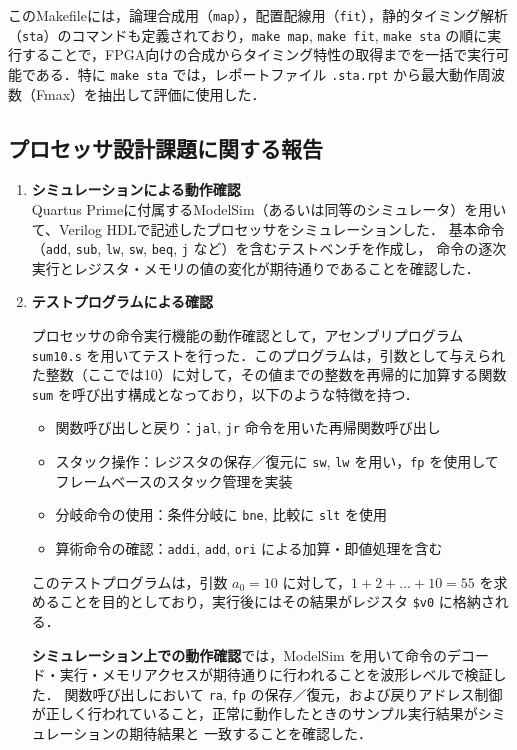 \documentclass[autodetect-engine,dvi=dvipdfmx,ja=standard,
               a4j,11pt]{bxjsarticle}
\begin{document}
このMakefileには，論理合成用（\texttt{map}），配置配線用（\texttt{fit}），静的タイミング解析（\texttt{sta}）のコマンドも定義されており，\texttt{make map}, \texttt{make fit}, \texttt{make sta} の順に実行することで，FPGA向けの合成からタイミング特性の取得までを一括で実行可能である．特に \texttt{make sta} では，レポートファイル \texttt{.sta.rpt} から最大動作周波数（Fmax）を抽出して評価に使用した．

\subsection{プロセッサ設計課題に関する報告}
\begin{enumerate}
  \item \textbf{シミュレーションによる動作確認} \\
  Quartus Primeに付属するModelSim（あるいは同等のシミュレータ）を用いて、Verilog HDLで記述したプロセッサをシミュレーションした．
  基本命令（\texttt{add}, \texttt{sub}, \texttt{lw}, \texttt{sw}, \texttt{beq}, \texttt{j} など）を含むテストベンチを作成し，
  命令の逐次実行とレジスタ・メモリの値の変化が期待通りであることを確認した．
  \item \textbf{テストプログラムによる確認}

プロセッサの命令実行機能の動作確認として，アセンブリプログラム \texttt{sum10.s} を用いてテストを行った．このプログラムは，引数として与えられた整数（ここでは10）に対して，その値までの整数を再帰的に加算する関数 \texttt{sum} を呼び出す構成となっており，以下のような特徴を持つ．

\begin{itemize}
  \item 関数呼び出しと戻り：\texttt{jal}, \texttt{jr} 命令を用いた再帰関数呼び出し
  \item スタック操作：レジスタの保存／復元に \texttt{sw}, \texttt{lw} を用い，\texttt{fp} を使用してフレームベースのスタック管理を実装
  \item 分岐命令の使用：条件分岐に \texttt{bne}, 比較に \texttt{slt} を使用
  \item 算術命令の確認：\texttt{addi}, \texttt{add}, \texttt{ori} による加算・即値処理を含む
\end{itemize}

このテストプログラムは，引数 $a_0 = 10$ に対して，$1 + 2 + \dots + 10 = 55$ を求めることを目的としており，実行後にはその結果がレジスタ \texttt{\$v0} に格納される．

\textbf{シミュレーション上での動作確認}では，ModelSim を用いて命令のデコード・実行・メモリアクセスが期待通りに行われることを波形レベルで検証した．
関数呼び出しにおいて \texttt{ra}, \texttt{fp} の保存／復元，および戻りアドレス制御が正しく行われていること，正常に動作したときのサンプル実行結果がシミュレーションの期待結果と
一致することを確認した．
\end{enumerate}
\end{document}

